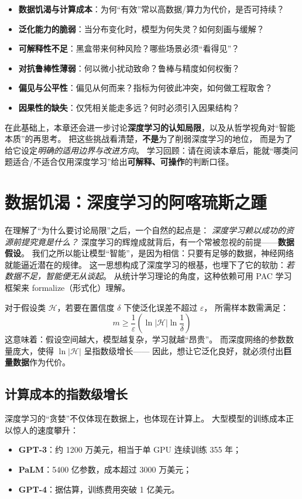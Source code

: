 \begin{itemize}
\item \textbf{数据饥渴与计算成本}：为何“有效”常以高数据/算力为代价，是否可持续？
\item \textbf{泛化能力的脆弱}：当分布变化时，模型为何失灵？如何刻画与缓解？
\item \textbf{可解释性不足}：黑盒带来何种风险？哪些场景必须“看得见”？
\item \textbf{对抗鲁棒性薄弱}：何以微小扰动致命？鲁棒与精度如何权衡？
\item \textbf{偏见与公平性}：偏见从何而来？指标为何彼此冲突，如何做工程取舍？
\item \textbf{因果性的缺失}：仅凭相关能走多远？何时必须引入因果结构？
\end{itemize}
在此基础上，本章还会进一步讨论\textbf{深度学习的认知局限}，以及从哲学视角对“智能本质”的再思考。 
把这些挑战看清楚，\textbf{不是}为了削弱深度学习的地位，  
而是为了给它设定\textit{明确的适用边界与改进方向}。  
学习回顾：请在阅读本章后，能就“哪类问题适合/不适合仅用深度学习”给出\textbf{可解释、可操作}的判断口径。

\section{数据饥渴：深度学习的阿喀琉斯之踵}
在理解了“为什么要讨论局限”之后，一个自然的起点是：  
\textit{深度学习赖以成功的资源前提究竟是什么？}  
深度学习的辉煌成就背后，有一个常被忽视的前提——\textbf{数据假设}。  
我们之所以能让模型“智能”，是因为相信：只要有足够的数据，神经网络就能逼近潜在的规律。  
这一思想构成了深度学习的根基，也埋下了它的软肋：\textit{若数据不足，智能便无从谈起}。  
从统计学习理论的角度，这种依赖可用 PAC 学习框架来 formalize（形式化）理解。

对于假设类 $\mathcal{H}$，若要在置信度 $\delta$ 下使泛化误差不超过 $\varepsilon$，  
所需样本数需满足：
$$m \geq \frac{1}{\varepsilon}\left(\ln|\mathcal{H}|  \ln\frac{1}{\delta}\right)$$  
这意味着：假设空间越大，模型越复杂，学习就越“昂贵”。  
而深度网络的参数数量庞大，使得 $\ln|\mathcal{H}|$ 呈指数级增长——  
因此，想让它泛化良好，就必须付出\textbf{巨量数据}作为代价。

\subsection{计算成本的指数级增长}

深度学习的“贪婪”不仅体现在数据上，也体现在计算上。  
大型模型的训练成本正以惊人的速度攀升：  

\begin{itemize}
\item \textbf{GPT-3}：约 1200 万美元，相当于单 GPU 连续训练 355 年；
\item \textbf{PaLM}：5400 亿参数，成本超过 3000 万美元；
\item \textbf{GPT-4}：据估算，训练费用突破 1 亿美元。
\end{itemize}

